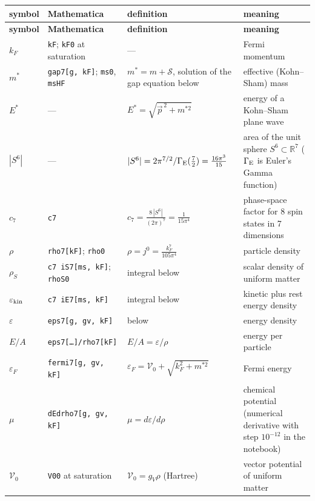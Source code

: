 \documentclass[10pt,a4paper]{article}
\begin{document}
{\small
\begin{longtable}{>{\raggedright\arraybackslash}p{}>{\raggedright\arraybackslash}p{}>{\raggedright\arraybackslash}p{}>{\raggedright\arraybackslash}p{}}
\toprule
\textbf{symbol} & \textbf{Mathematica} & \textbf{definition} & \textbf{meaning} \\
\midrule\endfirsthead
\toprule
\textbf{symbol} & \textbf{Mathematica} & \textbf{definition} & \textbf{meaning} \\
\midrule\endhead
\endfoot
\bottomrule\endlastfoot
$k_F$ & \texttt{kF}; \texttt{kF0} at saturation & — & Fermi momentum \\
$m^*$ & \texttt{gap7[g, kF]}; \texttt{ms0}, \texttt{msHF} & $m^*=m+\mathcal S$, solution of the gap equation below & effective (Kohn–Sham) mass \\
$E^*$ & — & $E^*=\sqrt{\vec p^{\,2}+m^{*2}}$ & energy of a Kohn–Sham plane wave \\
$|S^6|$ & — & $|S^6|=2\pi^{7/2}/\Gamma_{\rm E}(\tfrac72)=\frac{16\pi^3}{15}$ & area of the unit sphere $S^6\subset\mathbb R^7$ ($\Gamma_{\rm E}$ is Euler’s Gamma function) \\
$c_7$ & \texttt{c7} & $c_7=\frac{8\,|S^6|}{(2\pi)^7}=\frac1{15\pi^4}$ & phase-space factor for 8 spin states in 7 dimensions \\
$\rho$ & \texttt{rho7[kF]}; \texttt{rho0} & $\rho=j^0=\frac{k_F^7}{105\pi^4}$ & particle density \\
$\rho_S$ & \texttt{c7 iS7[ms, kF]}; \texttt{rhoS0} & integral below & scalar density of uniform matter \\
$\varepsilon_{\rm kin}$ & \texttt{c7 iE7[ms, kF]} & integral below & kinetic plus rest energy density \\
$\varepsilon$ & \texttt{eps7[g, gv, kF]} & below & energy density \\
$E/A$ & \texttt{eps7[…]/\allowbreak{}rho7[kF]} & $E/A=\varepsilon/\rho$ & energy per particle \\
$\varepsilon_F$ & \texttt{fermi7[g, gv, kF]} & $\varepsilon_F=\mathcal V_0+\sqrt{k_F^2+m^{*2}}$ & Fermi energy \\
$\mu$ & \texttt{dEdrho7[g, gv, kF]} & $\mu=d\varepsilon/d\rho$ & chemical potential (numerical derivative with step $10^{-12}$ in the notebook) \\
$\mathcal V_0$ & \texttt{V00} at saturation & $\mathcal V_0=g_V\rho$ (Hartree) & vector potential of uniform matter \\

\end{longtable}}
\end{document}
